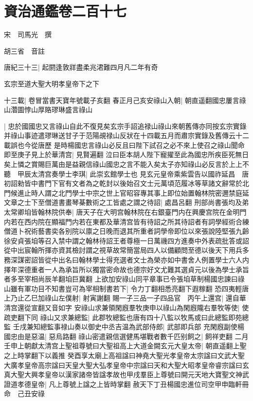 \chapter{資治通鑑卷二百十七}
宋　司馬光　撰

胡三省　音註

唐紀三十三|{
	起閼逢敦牂盡柔兆涒難四月凡二年有奇}


玄宗至道大聖大明孝皇帝下之下

十三載|{
	卷冒當書天寶年號載子亥翻}
春正月己亥安祿山入朝|{
	朝直遥翻國忠屢言祿山濳圖悖山厚賂璆琳盛言祿山}


|{
	忠於國國忠又言祿山自此不復見矣玄宗手詔追禄山祿山來朝舊傳亦同按玄宗實錄并祿山事迹遣璆琳送甘子于范陽覘禄山反狀在十四載五月而肅宗實錄及舊傳云十二載誤也今從唐歷}
是時楊國忠言祿山必反且曰陛下試召之必不來上使召之祿山聞命即至庚子見上於華清宫|{
	見賢遍翻}
泣曰臣本胡人陛下寵擢至此為國忠所疾臣死無日矣上憐之賞賜巨萬由是益親信祿山國忠之言不能入矣太子亦知祿山必反言於上上不聽　甲辰太清宫奏學士李琪|{
	此崇玄館學士也}
見玄元皇帝乘紫雲告以國祚延昌　唐初詔勑皆中書門下官有文者為之乾封以後始召文士元萬頃范履冰等草諸文辭常於北門候進止時人謂之北門學士中宗之世上官昭容專其事上即位始置翰林院密邇禁庭延文章之士下至僧道書畫琴棊數術之工皆處之謂之待詔|{
	處昌呂翻}
刑部尚書張均及弟太常卿垍皆翰林院供奉|{
	唐天子在大明宫翰林院在右銀臺門内在興慶宫院在金明門内若在西内院在顯福門内若在東都及華清宫皆有待詔之所其待詔者有詞學經術合練僧道卜祝術藝書奕各别院以廪之日晚而退其所重者詞學帝即位以來張說陸堅張九齡徐安貞張垍等召入禁中謂之翰林待詔王者尊極一日萬禨四方進奏中外表疏批答或詔從中出宸翰所揮亦資其檢討謂之視草故常簡當局四人以備顧問至德以後天下用兵多務深謀密詔皆從中出名曰翰林學士得充選者文士為榮亦如中書舍人例置學士六人内擇年深德重者一人為承旨所以獨當密命故也德宗好文尤難其選貞元以後為學士承旨者多至宰相尚辰羊翻垍巨冀翻}
上欲加安祿山同平章事已令張垍草制楊國忠諫曰祿山雖有軍功目不知書豈可為宰相制書若下|{
	令力丁翻相悉亮翻下遐稼翻}
恐四夷輕唐上乃止乙巳加祿山左僕射|{
	射寅謝翻}
賜一子三品一子四品官　丙午上還宫|{
	還自華清宫還從宣翻又音如字}
安祿山求兼領閑廐羣牧庚申以祿山為閑廐隴右羣牧等使|{
	使疏吏翻下同}
祿山又求兼總監|{
	此郡牧總監也唐有四十八監以牧馬或曰此總監即苑總監}
壬戌兼知總監事禄山奏以御史中丞吉温為武部侍郎|{
	武部即兵部}
充閑廐副使楊國忠由是惡温|{
	惡烏路翻}
祿山密遣親信選健馬堪戰者數千匹别飼之|{
	飼祥吏翻}
二月壬申上朝獻太清宫上聖祖尊號曰大聖祖高上大道金闕玄元大皇太帝|{
	朝直遥翻上聖之上時掌翻下以義推}
癸酉享太廟上高祖諡曰神堯大聖光孝皇帝太宗諡曰文武大聖大廣孝皇帝高宗諡曰天皇大聖大弘孝皇帝中宗諡曰天和大聖大昭孝皇帝睿宗諡曰玄真大聖大興孝皇帝以漢家諸帝皆諡孝故也甲戌羣臣上尊號曰開元天地大寶聖文神武證道孝德皇帝|{
	凡上尊號上諡之上皆時掌翻}
赦天下丁丑楊國忠進位司空甲申臨軒冊命　己丑安祿

